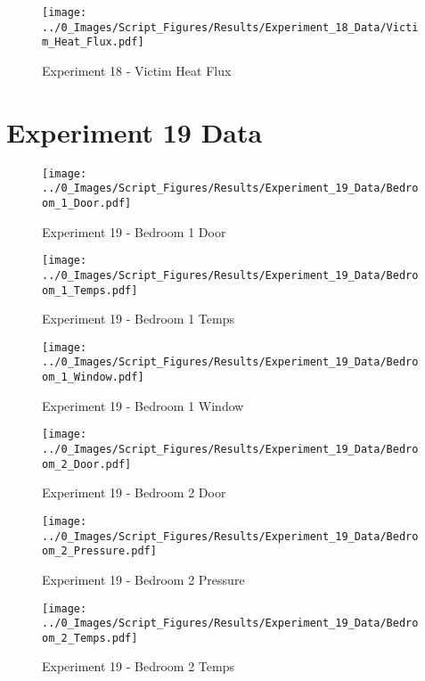 	\begin{figure}[H]
		\centering
		\texttt{[image: ../0\_Images/Script\_Figures/Results/Experiment\_18\_Data/Victim\_Heat\_Flux.pdf]}
		\caption[]{Experiment 18 - Victim Heat Flux}
	\end{figure}
 
	\clearpage

\clearpage		\large
\section{Experiment 19 Data} \label{App:Exp19Results} 

	\begin{figure}[H]
		\centering
		\texttt{[image: ../0\_Images/Script\_Figures/Results/Experiment\_19\_Data/Bedroom\_1\_Door.pdf]}
		\caption[]{Experiment 19 - Bedroom 1 Door}
	\end{figure}
 

	\begin{figure}[H]
		\centering
		\texttt{[image: ../0\_Images/Script\_Figures/Results/Experiment\_19\_Data/Bedroom\_1\_Temps.pdf]}
		\caption[]{Experiment 19 - Bedroom 1 Temps}
	\end{figure}
 
	\clearpage

	\begin{figure}[H]
		\centering
		\texttt{[image: ../0\_Images/Script\_Figures/Results/Experiment\_19\_Data/Bedroom\_1\_Window.pdf]}
		\caption[]{Experiment 19 - Bedroom 1 Window}
	\end{figure}
 

	\begin{figure}[H]
		\centering
		\texttt{[image: ../0\_Images/Script\_Figures/Results/Experiment\_19\_Data/Bedroom\_2\_Door.pdf]}
		\caption[]{Experiment 19 - Bedroom 2 Door}
	\end{figure}
 
	\clearpage

	\begin{figure}[H]
		\centering
		\texttt{[image: ../0\_Images/Script\_Figures/Results/Experiment\_19\_Data/Bedroom\_2\_Pressure.pdf]}
		\caption[]{Experiment 19 - Bedroom 2 Pressure}
	\end{figure}
 

	\begin{figure}[H]
		\centering
		\texttt{[image: ../0\_Images/Script\_Figures/Results/Experiment\_19\_Data/Bedroom\_2\_Temps.pdf]}
		\caption[]{Experiment 19 - Bedroom 2 Temps}
	\end{figure}
 
